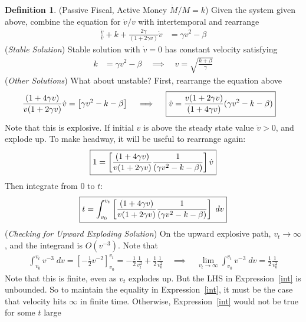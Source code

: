 \documentclass[12pt]{article}
\theoremstyle{plain}
\theoremstyle{definition}
\newtheorem{defn}[thm]{Definition}
\theoremstyle{remark}
\newcommand{\ra}{\rightarrow}
\begin{document}
\begin{defn}(Passive Fiscal, Active Money $\dot{M}/M=k$)
Given the system given above, combine the equation for $\dot{v}/v$ with
intertemporal and rearrange
\begin{align*}
  \frac{\dot{v}}{v}
  + k
  + \frac{2 \gamma }{\left( 1+2\gamma v \right)}\dot{v}
  &=
  \gamma v^2
  -\beta
\end{align*}
(\emph{Stable Solution})
Stable solution with $\dot{v}=0$ has constant velocity satisfying
\begin{align*}
  k
  &=
  \gamma v^2
  -\beta
  \quad\implies\quad
  v = \sqrt{\frac{k+\beta}{\gamma}}
\end{align*}
(\emph{Other Solutions})
What about unstable? First, rearrange the equation above
\begin{align*}
  \frac{(1+4\gamma v)}{v(1+2\gamma v)}
  \dot{v}
  &=
  \left[
  \gamma v^2
  - k
  -\beta
  \right]
  \quad\implies\quad
  \boxed{%
    \dot{v}
    =
    \frac{v(1+2\gamma v)}{(1+4\gamma v)}
    (\gamma v^2 - k -\beta)
  }
\end{align*}
Note that this is explosive. If initial $v$ is above the steady state
value $\dot{v}>0$, and explode up.
To make headway, it will be useful to rearrange again:
\begin{align*}
  \boxed{%
    1=
    \left[
    \frac{(1+4\gamma v)}{v(1+2\gamma v)}
    \frac{1}{(\gamma v^2 - k -\beta)}
    \right]
    \dot{v}
  }
\end{align*}
Then integrate from $0$ to $t$:
\begin{align}
  \boxed{%
    t=
    \int_{v_0}^{v_t}
    \left[
    \frac{(1+4\gamma v)}{v(1+2\gamma v)}
    \frac{1}{(\gamma v^2 - k -\beta)}
    \right]
    \;dv
  }
  \label{int}
\end{align}
(\emph{Checking for Upward Exploding Solution})
On the upward explosive path, $v_t\ra\infty$, and
the integrand is $O(v^{-3})$. Note that
\begin{align*}
  \int_{v_0}^{v_t} v^{-3}\;dv
  =
  \left[
    -\frac{1}{2}
    v^{-2}
  \right]_{v_0}^{v_t}
  =
  -\frac{1}{2}
  \frac{1}{v_t^2}
  +
  \frac{1}{2}
  \frac{1}{v_0^2}
  \quad\implies\quad
  \lim_{v_t\ra \infty}
  \int_{v_0}^{v_t} v^{-3}\;dv
  =
  \frac{1}{2}
  \frac{1}{v_0^2}
\end{align*}
Note that this is finite, even as $v_t$ explodes up.
But the LHS in Expression~\ref{int} is unbounded.
So to maintain the equality in Expression~\ref{int}, it must be the case
that velocity hits $\infty$ in finite time.
Otherwise, Expression~\ref{int} would not be true for some $t$ large

\end{defn}
\end{document}
